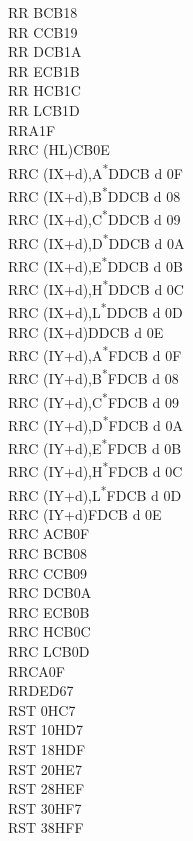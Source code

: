 \documentclass[twoside,openright,a4paper]{book}
\begin{document}
\begin{multicols}{3}
{\begin{tabbing}
	RR B\>CB18\\
	RR C\>CB19\\
	RR D\>CB1A\\
	RR E\>CB1B\\
	RR H\>CB1C\\
	RR L\>CB1D\\
	RRA\>1F\\
	RRC (HL)\>CB0E\\
	RRC (IX+d),A\textsuperscript{*}\>DDCB d 0F\\
	RRC (IX+d),B\textsuperscript{*}\>DDCB d 08\\
	RRC (IX+d),C\textsuperscript{*}\>DDCB d 09\\
	RRC (IX+d),D\textsuperscript{*}\>DDCB d 0A\\
	RRC (IX+d),E\textsuperscript{*}\>DDCB d 0B\\
	RRC (IX+d),H\textsuperscript{*}\>DDCB d 0C\\
	RRC (IX+d),L\textsuperscript{*}\>DDCB d 0D\\
	RRC (IX+d)\>DDCB d 0E\\
	RRC (IY+d),A\textsuperscript{*}\>FDCB d 0F\\
	RRC (IY+d),B\textsuperscript{*}\>FDCB d 08\\
	RRC (IY+d),C\textsuperscript{*}\>FDCB d 09\\
	RRC (IY+d),D\textsuperscript{*}\>FDCB d 0A\\
	RRC (IY+d),E\textsuperscript{*}\>FDCB d 0B\\
	RRC (IY+d),H\textsuperscript{*}\>FDCB d 0C\\
	RRC (IY+d),L\textsuperscript{*}\>FDCB d 0D\\
	RRC (IY+d)\>FDCB d 0E\\
	RRC A\>CB0F\\
	RRC B\>CB08\\
	RRC C\>CB09\\
	RRC D\>CB0A\\
	RRC E\>CB0B\\
	RRC H\>CB0C\\
	RRC L\>CB0D\\
	RRCA\>0F\\
	RRD\>ED67\\
	RST 0H\>C7\\
	RST 10H\>D7\\
	RST 18H\>DF\\
	RST 20H\>E7\\
	RST 28H\>EF\\
	RST 30H\>F7\\
	RST 38H\>FF\\

\end{tabbing}}
\end{multicols}
\end{document}
